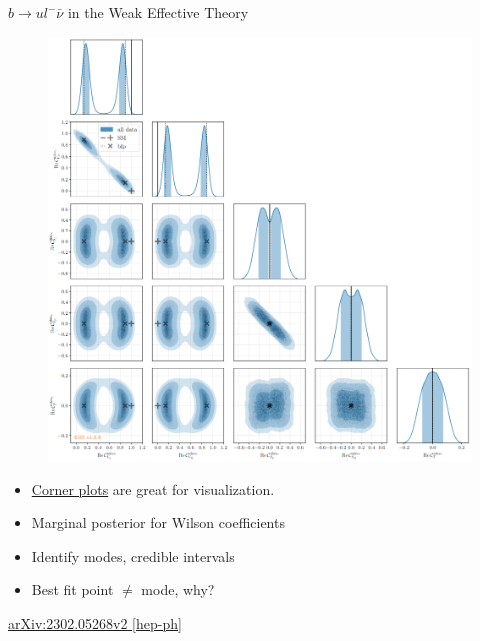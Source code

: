 \documentclass[
aspectratio=169,
14pt,
professionalfonts
]{beamer}
\begin{document}
\begin{frame}{$b\to u l^- \bar \nu$ in the Weak Effective Theory}
    \vspace{-0.5cm}
    \begin{minipage}{0.5\textwidth}
        \begin{figure}
            \includegraphics[width=\textwidth]{../plots/wet-posterior.png}
        \end{figure}
    \end{minipage}
    \begin{minipage}{0.49\textwidth}
        \begin{itemize}
            \item \href{https://corner.readthedocs.io/en/latest/}{Corner plots} are great for visualization.
            \item Marginal posterior for Wilson coefficients
            \item Identify modes, credible intervals
            \item Best fit point $\neq$ mode, why?
        \end{itemize}
        \vspace{0.5cm}
        \begin{flushright}
            \href{https://arxiv.org/pdf/2302.05268}{arXiv:2302.05268v2 [hep-ph]}
        \end{flushright}
    \end{minipage}
\end{frame}
\end{document}
